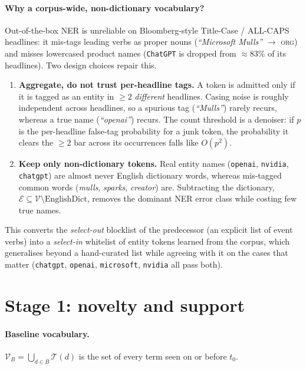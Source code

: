 \documentclass[11pt]{article}
\newcommand{\Terms}{\mathcal{T}}                          %
\newcommand{\Vocab}{\mathcal{V}}                          %
\newcommand{\Base}{\mathcal{V}_{B}}                       %
\newcommand{\Ent}{\mathcal{E}}                            %
\theoremstyle{definition}
\theoremstyle{remark}
\begin{document}
\paragraph{Why a corpus-wide, non-dictionary vocabulary?}
Out-of-the-box NER is unreliable on Bloomberg-style Title-Case / ALL-CAPS headlines: it
mis-tags leading verbs as proper nouns (\emph{``Microsoft Mulls''} $\to$ \textsc{org}) and
misses lowercased product names (\texttt{ChatGPT} is dropped from $\approx 83\%$ of its
headlines). Two design choices repair this.
\begin{enumerate}[leftmargin=1.6em]
  \item \textbf{Aggregate, do not trust per-headline tags.} A token is admitted only if it is
        tagged as an entity in $\ge 2$ \emph{different} headlines. Casing noise is roughly
        independent across headlines, so a spurious tag (\emph{``Mulls''}) rarely recurs,
        whereas a true name (\emph{``openai''}) recurs. The count threshold is a denoiser:
        if $p$ is the per-headline false-tag probability for a junk token, the probability it
        clears the $\ge\!2$ bar across its occurrences falls like $O(p^2)$.
  \item \textbf{Keep only non-dictionary tokens.} Real entity names (\texttt{openai},
        \texttt{nvidia}, \texttt{chatgpt}) are almost never English dictionary words, whereas
        mis-tagged common words (\emph{mulls}, \emph{sparks}, \emph{creator}) are. Subtracting
        the dictionary, $\Ent \subseteq \Vocab\setminus\text{EnglishDict}$, removes the dominant
        NER error class while costing few true names.
\end{enumerate}
This converts the \emph{select-out} blocklist of the predecessor (an explicit list of
event verbs) into a \emph{select-in} whitelist of entity tokens learned from the corpus, which
generalises beyond a hand-curated list while agreeing with it on the cases that matter
(\texttt{chatgpt}, \texttt{openai}, \texttt{microsoft}, \texttt{nvidia} all pass both).

\section{Stage 1: novelty and support}\label{sec:stage1}

\paragraph{Baseline vocabulary.}
$\Base=\bigcup_{d\in B}\Terms(d)$ is the set of every term seen on or before $t_0$.
\end{document}
